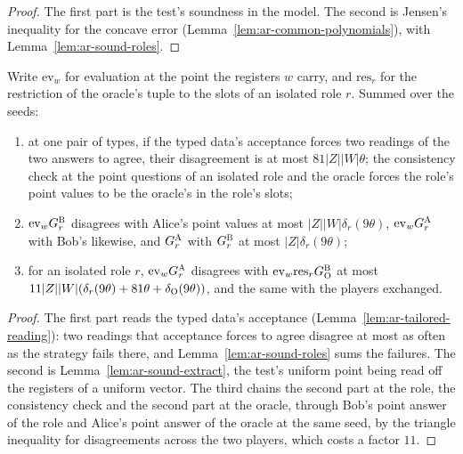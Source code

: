 \begin{proof}
\leanok
The first part is the test's soundness in the model. The second is Jensen's inequality for the
concave error (Lemma~\ref{lem:ar-common-polynomials}), with Lemma~\ref{lem:ar-sound-roles}.
\end{proof}

\begin{lemma}
\label{lem:ar-sound-relations}
\leanok
Write $\mathrm{ev}_w$ for evaluation at the point the registers $w$ carry, and $\mathrm{res}_r$
for the restriction of the oracle's tuple to the slots of an isolated role $r$. Summed over the
seeds:
\begin{enumerate}
\item at one pair of types, if the typed data's acceptance forces two readings of the two answers
to agree, their disagreement is at most $81 |Z| |W| \theta$; the consistency check at the point
questions of an isolated role and the oracle forces the role's point values to be the oracle's
in the role's slots;
\item $\mathrm{ev}_w G^{\textsc{B}}_r$ disagrees with Alice's point values at most $|Z| |W|
\delta_r(9\theta)$, $\mathrm{ev}_w G^{\textsc{A}}_r$ with Bob's likewise, and $G^{\textsc{A}}_r$ with
$G^{\textsc{B}}_r$ at most $|Z| \delta_r(9\theta)$;
\item for an isolated role $r$, $\mathrm{ev}_w G^{\textsc{A}}_r$ disagrees with
$\mathrm{ev}_w \mathrm{res}_r G^{\textsc{B}}_{\textsc{O}}$ at most $11 |Z| |W| (\delta_r(9\theta) + 81 \theta
+ \delta_{\textsc{O}}(9\theta))$, and the same with the players exchanged.
\end{enumerate}
\end{lemma}

\begin{proof}
\leanok
The first part reads the typed data's acceptance (Lemma~\ref{lem:ar-tailored-reading}): two
readings that acceptance forces to agree disagree at most as often as the strategy fails there,
and Lemma~\ref{lem:ar-sound-roles} sums the failures. The second is
Lemma~\ref{lem:ar-sound-extract}, the test's uniform point being read off the registers of a
uniform vector. The third chains the second part at the role, the consistency check and the second
part at the oracle, through Bob's point answer of the role and Alice's point answer of the oracle
at the same seed, by the triangle inequality for disagreements across the two players, which costs
a factor $11$.
\end{proof}

